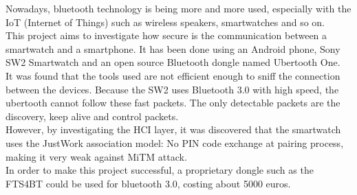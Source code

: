 Nowadays, bluetooth technology is being more and more used, especially with the IoT (Internet of Things) such as wireless speakers, smartwatches and so on.\\
This project aims to investigate how secure is the communication between a smartwatch and a smartphone. It has been done using an Android phone, Sony SW2 Smartwatch and an open source Bluetooth dongle named Ubertooth One.\\

It was found that the tools used are not efficient enough to sniff the connection between the devices. Because the SW2 uses Bluetooth 3.0 with high speed, the ubertooth cannot follow these fast packets. The only detectable packets are the discovery, keep alive and control packets.\\
However, by investigating the HCI layer, it was discovered that the smartwatch uses the JustWork association model: No PIN code exchange at pairing process, making it very weak against MiTM attack.\\

In order to make this project successful, a proprietary dongle such as the FTS4BT could be used for bluetooth 3.0, costing about 5000 euros.